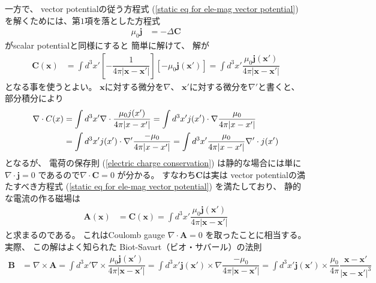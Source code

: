 一方で、
vector potentialの従う方程式
(\ref{static eq for ele-mag vector potential})
を解くためには、第$1$項を落とした方程式
\begin{align}
  \mu_0 \bm{j}
&=
  -
    \Delta
    \bm{C}
\end{align}
がscalar potentialと同様にすると
簡単に解けて、
解が
\begin{align}
  \bm{C} (\bm{x})
&=
  \int d^3 x'
  \left[
    - \dfrac{1}{
      4 \pi |\bm{x} - \bm{x}'|
    }
  \right]
  \left[
    - \mu_0
    \bm{j} (\bm{x}')
  \right]
=
  \int d^3 x'
    \dfrac{
      \mu_0 \bm{j} (\bm{x}')
    }{
      4 \pi
      |\bm{x} - \bm{x}'|
    }
\end{align}
となる事を使うとよい。
$\bm{x}$に対する微分を$\nabla$、
$\bm{x}'$に対する微分を$\nabla'$と書くと、
部分積分により
\begin{align}
  \nabla \cdot C(x)
&=
  \int d^3 x'
    \nabla \cdot
    \dfrac{
      \mu_0 j (x')
    }{
      4 \pi
      |x - x'|
    }
=
  \int d^3 x'
    j (x')
  \cdot
    \nabla
    \dfrac{ \mu_0 }{
      4 \pi
      |x - x'|
    }
\notag\\&
=
  \int d^3 x'
    j (x')
  \cdot
    \nabla'
    \dfrac{ -\mu_0 }{
      4 \pi
      |x - x'|
    }
=
  \int d^3 x'
    \dfrac{ \mu_0 }{
      4 \pi
      |x - x'|
    }
    \nabla' \cdot j (x')
\end{align}
となるが、
電荷の保存則
(\ref{electric charge conservation})
は静的な場合には単に
$\nabla \cdot \bm{j} = 0$
であるので$\nabla \cdot \bm{C} = 0$
が分かる。
すなわち$\bm{C}$は実は
vector potentialの満たすべき方程式
(\ref{static eq for ele-mag vector potential})
を満たしており、
静的な電流の作る磁場は
\begin{align}
  \bm{A} (\bm{x})
&=
  \bm{C} (\bm{x})
=
  \int d^3 x'
    \dfrac{
      \mu_0 \bm{j} (\bm{x}')
    }{
      4 \pi
      |\bm{x} - \bm{x}'|
    }
\end{align}
と求まるのである。
これはCoulomb gauge
$\nabla \cdot\bm{A} = 0$
を取ったことに相当する。
実際、
この解はよく知られた
Biot-Savart（ビオ・サバール）の法則
\begin{align}
  \bm{B}
&=
  \nabla \times \bm{A}
=
  \int d^3 x'
  \nabla \times
    \dfrac{
      \mu_0 \bm{j} (\bm{x}')
    }{
      4 \pi
      |\bm{x} - \bm{x}'|
    }
=
  \int d^3 x'
  \bm{j} (\bm{x}') \times
  \nabla
    \dfrac{
      - \mu_0
    }{
      4 \pi
      |\bm{x} - \bm{x}'|
    }
=
  \int d^3 x'
  \bm{j} (\bm{x}') \times
  \dfrac{\mu_0}{4 \pi}
  \dfrac{ \bm{x} - \bm{x}' }{ |\bm{x} - \bm{x}'|^3 }
\end{align}
